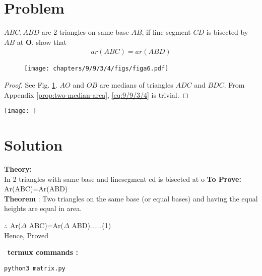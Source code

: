 \documentclass[10pt, a4paper]{article}
\title{\mytitle}
\author{\myauthor\hspace{1em}\\\contact\\FWC22031\hspace{6.5em}IITH\hspace{0.5em}\mymodule\hspace{6em}ASSIGN-5}
\date{}
\let\vec\mathbf
\begin{document}
	\maketitle
	\tableofcontents
   \section{Problem}
   \fi
   $ABC, ABD$ are 2 triangles on same base $AB$, if line segment $CD$ is bisected by $AB$ at $\vec{O}$, show that 
   \begin{align}
		\label{eq:9/9/3/4}
 ar (ABC) = ar (ABD)  
   \end{align}
	\begin{figure}[H]
		\centering
 \texttt{[image: chapters/9/9/3/4/figs/figa6.pdf]}
		\caption{}
		\label{fig:9/9/3/4}
  	\end{figure}
	\begin{proof}
		See Fig. 
		\ref{fig:9/9/3/4}. $AO$ and $OB$ are medians of triangles $ADC$ and $BDC$. From 
Appendix	  \ref{prop:two-median-area}, 
		\eqref{eq:9/9/3/4} is trivial.
	\end{proof}


\iffalse

	    \texttt{[image: ]}
   \section{Solution}
   \textbf{Theory:}\\
In 2 triangles with same base and linesegment cd is bisected at o  
\textbf{To Prove:} Ar(ABC)=Ar(ABD) \\
\textbf{Theorem} : Two triangles on the same base (or equal bases) and having the equal heights are equal in area.
\begin{center}
$\therefore$ Ar($\Delta$ ABC)=Ar($\Delta$ ABD)......(1)\\
Hence, Proved    
\end{center}


\
\textbf{termux commands :}
\begin{lstlisting}
python3 matrix.py
\end{lstlisting}
\end{document}

